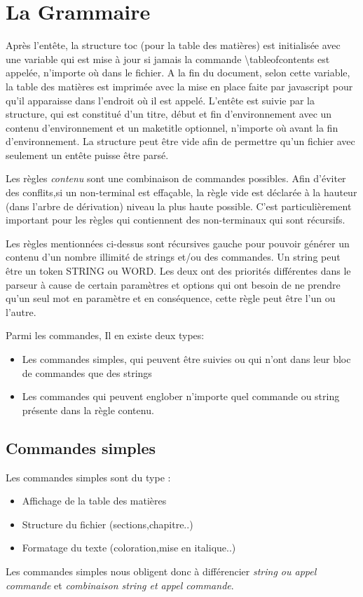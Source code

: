 \documentclass{report}
\begin{document}
\section{La Grammaire}{
Après l'entête, la structure toc (pour la table des matières) est initialisée avec une variable qui est mise à jour si jamais la commande \textbackslash tableofcontents est appelée, n'importe où dans le fichier. A la fin du document, selon cette variable, la table des matières est imprimée avec la mise en place faite par javascript pour qu'il apparaisse dans l'endroit où il est appelé. L'entête est suivie par la structure, qui est constitué d'un titre, début et fin d'environnement avec un contenu d'environnement et un maketitle optionnel, n'importe où avant la fin d'environnement. La structure peut être vide afin de permettre  qu'un fichier avec seulement un entête puisse être parsé. 

Les règles \textit{contenu} sont une combinaison de commandes possibles. Afin d'éviter des conflits,si un non-terminal est effaçable, la règle vide est déclarée à la hauteur (dans l'arbre de dérivation) niveau la plus haute possible. C'est particulièrement important pour les règles qui contiennent des non-terminaux qui sont récursifs.

 Les règles mentionnées ci-dessus sont récursives gauche pour pouvoir générer un contenu d'un nombre illimité de strings et/ou des commandes. Un string peut être un token STRING ou WORD. Les deux ont des priorités différentes dans le parseur à cause de certain paramètres et options qui ont besoin de ne prendre qu'un seul mot en paramètre et en conséquence, cette règle peut être l'un ou l'autre.

Parmi les commandes, Il en existe deux types: 
\begin{itemize}
\item Les commandes simples, qui peuvent être suivies ou qui n'ont dans leur bloc de commandes que des strings 
\item Les commandes qui peuvent englober n'importe quel commande ou string présente dans la règle contenu.
\end{itemize}
\subsection{Commandes simples}{
Les commandes simples sont du type :
 \begin{itemize}
 \item Affichage de la table des matières
 \item Structure du fichier (sections,chapitre..)
 \item Formatage du texte (coloration,mise en italique..)
\end{itemize}
Les commandes simples nous obligent donc à différencier
 \textit{string ou appel commande} et
 \textit{combinaison string et appel commande}.
}}
\end{document}
